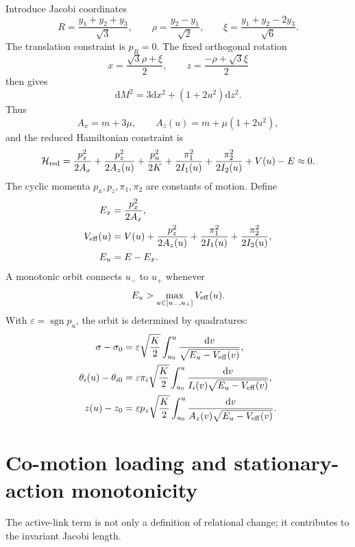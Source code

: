 \documentclass[11pt]{article}
\theoremstyle{plain}
\newcommand{\dd}{\mathrm d}
\begin{document}
Introduce Jacobi coordinates
\begin{equation}
R=\frac{y_1+y_2+y_3}{\sqrt3},\qquad \rho=\frac{y_2-y_1}{\sqrt2},\qquad \xi=\frac{y_1+y_2-2y_3}{\sqrt6}.
\end{equation}
The translation constraint is $p_R=0$. The fixed orthogonal rotation
\begin{equation}
x=\frac{\sqrt3\rho+\xi}{2},\qquad z=\frac{-\rho+\sqrt3\xi}{2}
\end{equation}
then gives
\begin{equation}
\dd M^2=3\dd x^2+(1+2u^2)\dd z^2.
\end{equation}
Thus
\begin{equation}
A_x=m+3\mu,\qquad A_z(u)=m+\mu(1+2u^2),
\end{equation}
and the reduced Hamiltonian constraint is
\begin{equation}
\mathcal H_{\rm red}=\frac{p_x^2}{2A_x}+\frac{p_z^2}{2A_z(u)}+\frac{p_u^2}{2K}+\frac{\pi_1^2}{2I_1(u)}+\frac{\pi_2^2}{2I_2(u)}+V(u)-E\approx0.
\end{equation}
The cyclic momenta $p_x,p_z,\pi_1,\pi_2$ are constants of motion. Define
\begin{align}
E_x&=\frac{p_x^2}{2A_x},\\
V_{\rm eff}(u)&=V(u)+\frac{p_z^2}{2A_z(u)}+\frac{\pi_1^2}{2I_1(u)}+\frac{\pi_2^2}{2I_2(u)},\\
E_u&=E-E_x.
\end{align}
A monotonic orbit connects $u_-$ to $u_+$ whenever
\begin{equation}
E_u>\max_{u\in[u_-,u_+]}V_{\rm eff}(u).
\end{equation}
With $\varepsilon=\operatorname{sgn}p_u$, the orbit is determined by quadratures:
\begin{align}
\sigma-\sigma_0&=\varepsilon\sqrt{\frac K2}\int_{u_0}^{u}\frac{\dd v}{\sqrt{E_u-V_{\rm eff}(v)}},\\
\theta_i(u)-\theta_{i0}&=\varepsilon\pi_i\sqrt{\frac K2}\int_{u_0}^{u}\frac{\dd v}{I_i(v)\sqrt{E_u-V_{\rm eff}(v)}},\\
z(u)-z_0&=\varepsilon p_z\sqrt{\frac K2}\int_{u_0}^{u}\frac{\dd v}{A_z(v)\sqrt{E_u-V_{\rm eff}(v)}}.
\end{align}

\section{Co-motion loading and stationary-action monotonicity}

The active-link term is not only a definition of relational change; it contributes to the invariant Jacobi length.
\end{document}
